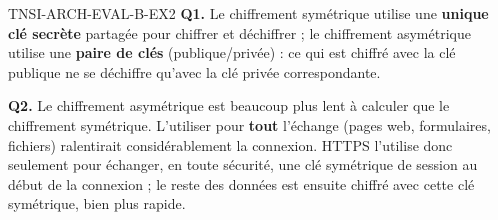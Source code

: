 \begin{corrige}{TNSI-ARCH-EVAL-B-EX2}
\textbf{Q1.} Le chiffrement symétrique utilise une \textbf{unique clé secrète} partagée pour chiffrer et déchiffrer ; le chiffrement asymétrique utilise une \textbf{paire de clés} (publique/privée) : ce qui est chiffré avec la clé publique ne se déchiffre qu'avec la clé privée correspondante.

\textbf{Q2.} Le chiffrement asymétrique est beaucoup plus lent à calculer que le chiffrement symétrique. L'utiliser pour \textbf{tout} l'échange (pages web, formulaires, fichiers) ralentirait considérablement la connexion. HTTPS l'utilise donc seulement pour échanger, en toute sécurité, une clé symétrique de session au début de la connexion ; le reste des données est ensuite chiffré avec cette clé symétrique, bien plus rapide.
\end{corrige}
